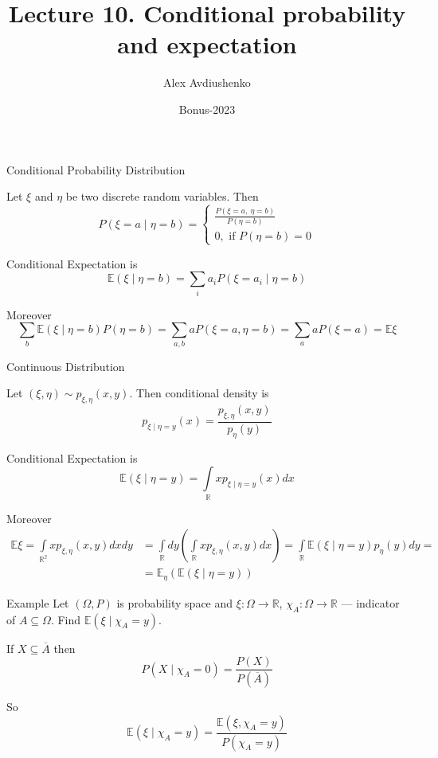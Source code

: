 \documentclass[fullscreen=true, bookmarks=true, hyperref={pdfencoding=unicode}]{beamer}
\title{Lecture 10. Conditional probability and expectation}
\author{Alex Avdiushenko}
\institute{Neapolis University Paphos}
\date{Bonus-2023}
\begin{document}
\begin{frame}
\transdissolve[duration=0.2]
\titlepage
\end{frame}


\begin{frame}{Conditional Probability Distribution}

  \pause
  \begin{definition}
    Let $\xi$ and $\eta$ be two discrete random variables. Then
    $$ P(\xi = a \mid \eta = b) = 
    \begin{cases}
      \frac{P(\xi = a,\ \eta = b)}{P(\eta = b)} \\
      0, \text{ if } P(\eta = b) = 0
    \end{cases} $$
  \end{definition}
  
  \pause
  Conditional Expectation is
  $$\mathbb{E}(\xi\mid \eta = b) = \sum\limits_i a_i P(\xi = a_i \mid \eta = b) $$

  \pause
  Moreover
  $$\sum\limits_b \mathbb{E}(\xi\mid \eta = b)P(\eta = b) = 
  \sum\limits_{a,b} a P(\xi = a, \eta = b) = \sum\limits_{a} a P(\xi = a) = \mathbb{E} \xi$$

\end{frame}


\begin{frame}{Continuous Distribution}
  \pause
  \begin{definition}
    Let $(\xi, \eta) \sim p_{\xi, \eta}(x, y)$. Then conditional density is
    \[
    p_{\xi \mid \eta = y} (x) = \frac{p_{\xi, \eta}(x, y)}{p_{\eta}(y)}
    \]
  \end{definition}
    
  \pause
  Conditional Expectation is
  $$\mathbb{E}(\xi\mid \eta = y) = \int\limits_{\mathbb{R}} x p_{\xi \mid \eta = y} (x) dx $$

  \pause
  Moreover
  \begin{align*}
    \mathbb{E} \xi = \int\limits_{\mathbb{R^2}} x p_{\xi, \eta}(x, y) dxdy &=
    \int\limits_{\mathbb{R}} dy \left( \int\limits_{\mathbb{R}} x p_{\xi, \eta}(x, y) dx \right) =
    \int\limits_{\mathbb{R}} \mathbb{E}(\xi\mid \eta = y) p_\eta(y) dy = \\
    &= \mathbb{E}_\eta \left(\mathbb{E}(\xi\mid \eta = y)\right)    
  \end{align*}
\end{frame}


\begin{frame}{Example}
  Let $(\Omega, P)$ is probability space and $\xi: \Omega \to \mathbb{R}$, 
  $\chi_A: \Omega \to \mathbb{R}$ — indicator of $A\subseteq \Omega$. 
  Find $\mathbb{E}(\xi\mid \chi_A = y)$.

  \vspace{1cm}
  \pause
  If $X\subseteq \overline{A}$ then
  $$ P(X\mid \chi_A = 0) = \frac{P(X)}{P(\overline{A})} $$

  \pause
  So $$\mathbb{E}(\xi\mid \chi_A = y) = \frac{\mathbb{E}(\xi, \chi_A = y)}{P(\chi_A = y)}$$
\end{frame}
\end{document}
